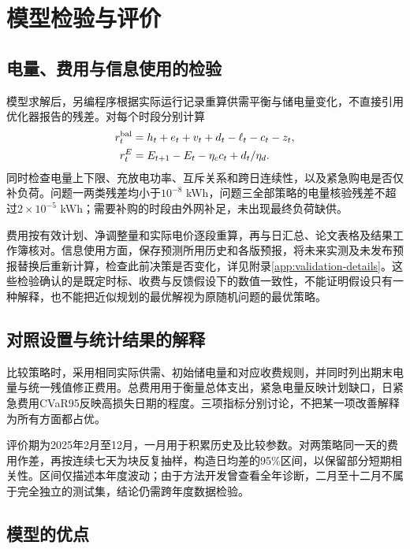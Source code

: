 \section{模型检验与评价}
\label{sec:model-validation}

\subsection{电量、费用与信息使用的检验}

模型求解后，另编程序根据实际运行记录重算供需平衡与储电量变化，不直接引用优化器报告的残差。对每个时段分别计算
\begin{equation}
\begin{aligned}
  r_t^{\rm bal}&=h_t+e_t+v_t+d_t-\ell_t-c_t-z_t,\\
  r_t^E&=E_{t+1}-E_t-\eta_cc_t+d_t/\eta_d.
\end{aligned}
\label{eq:residuals}
\end{equation}
同时检查电量上下限、充放电功率、互斥关系和跨日连续性，以及紧急购电是否仅补负荷。问题一两类残差均小于$10^{-8}$ kWh，问题三全部策略的电量核验残差不超过$2\times10^{-5}$ kWh；需要补购的时段由外网补足，未出现最终负荷缺供。

费用按有效计划、净调整量和实际电价逐段重算，再与日汇总、论文表格及结果工作簿核对。信息使用方面，保存预测所用历史和各版预报，将未来实测及未发布预报替换后重新计算，检查此前决策是否变化，详见附录\ref{app:validation-details}。这些检验确认的是既定时标、收费与反馈假设下的数值一致性，不能证明假设只有一种解释，也不能把近似规划的最优解视为原随机问题的最优策略。

\subsection{对照设置与统计结果的解释}

比较策略时，采用相同实际供需、初始储电量和对应收费规则，并同时列出期末电量与统一残值修正费用。总费用用于衡量总体支出，紧急电量反映计划缺口，日紧急费用CVaR95反映高损失日期的程度。三项指标分别讨论，不把某一项改善解释为所有方面都占优。

评价期为2025年2月至12月，一月用于积累历史及比较参数。对两策略同一天的费用作差，再按连续七天为块反复抽样，构造日均差的95\%区间，以保留部分短期相关性。区间仅描述本年度波动；由于方法开发曾查看全年诊断，二月至十二月不属于完全独立的测试集，结论仍需跨年度数据检验。

\subsection{模型的优点}

